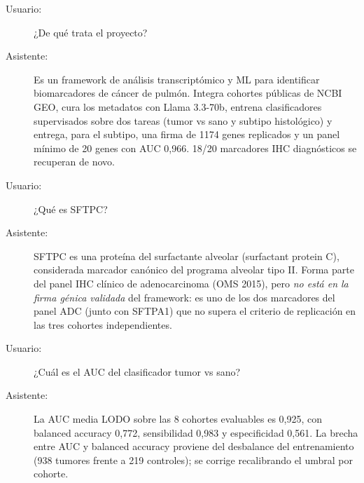\begin{description}
  \item[Usuario:] ¿De qué trata el proyecto?
  \item[Asistente:] Es un framework de análisis transcriptómico y ML
  para identificar biomarcadores de cáncer de pulmón. Integra cohortes
  públicas de NCBI GEO, cura los metadatos con Llama 3.3-70b, entrena
  clasificadores supervisados sobre dos tareas (tumor vs sano y subtipo
  histológico) y entrega, para el subtipo, una firma de 1174 genes
  replicados y un panel mínimo de 20 genes con AUC 0,966.
  18/20 marcadores IHC diagnósticos se recuperan de novo.

  \item[Usuario:] ¿Qué es SFTPC?
  \item[Asistente:] SFTPC es una proteína del surfactante alveolar
  (surfactant protein C), considerada marcador canónico del programa
  alveolar tipo II. Forma parte del panel IHC clínico de adenocarcinoma
  (OMS 2015), pero \emph{no está en la firma génica validada} del
  framework: es uno de los dos marcadores del panel ADC (junto con
  SFTPA1) que no supera el criterio de replicación en las tres cohortes
  independientes.

  \item[Usuario:] ¿Cuál es el AUC del clasificador tumor vs sano?
  \item[Asistente:] La AUC media LODO sobre las 8 cohortes evaluables
  es 0,925, con balanced accuracy 0,772, sensibilidad 0,983 y
  especificidad 0,561. La brecha entre AUC y balanced accuracy proviene
  del desbalance del entrenamiento (938 tumores frente a 219 controles);
  se corrige recalibrando el umbral por cohorte.
\end{description}
